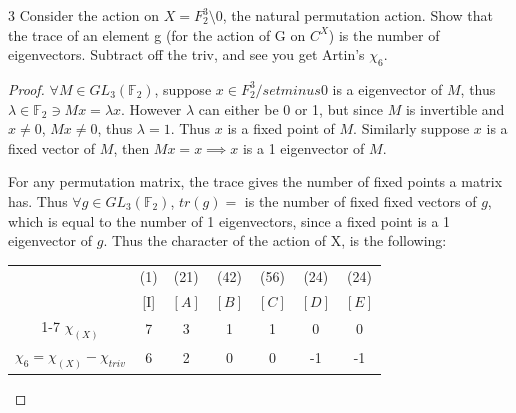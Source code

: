 \documentclass{article}
\newcommand*{\F}{\mathbb{F}}
\begin{document}
\bigskip
\begin{PROB}{3}\label{Problem 3.}
    Consider the action on $X = F_2^3 \setminus 0$, the natural permutation action. Show that the trace of an element  g (for the action of G  on $C^X$) is the number of eigenvectors. Subtract off the triv, and see you get Artin's $\chi_6$.
\end{PROB}
\begin{proof}
    $\forall M \in GL_{3}(\F_2)$, suppose $x \in F_2^3 / setminus 0$ is a eigenvector of $M$, thus $\lambda \in \F_2 \ni Mx = \lambda x$. However $\lambda$ can either be 0 or 1, but since $M$ is invertible and $x \neq 0$, $Mx \neq 0$, thus $\lambda = 1$.  Thus $x$ is a fixed point of $M$. Similarly suppose $x$ is a fixed vector of $M$, then $Mx = x \implies x$ is a 1 eigenvector of $M$. 
    
    
    For any permutation matrix, the trace gives the number of fixed points a matrix has. Thus $\forall g \in GL_{3}(\F_2)$, $tr(g) = $ is the number of fixed fixed vectors of $g$, which is equal to the number of 1 eigenvectors, since a fixed point is a 1 eigenvector of $g$. Thus the character of the action of X, is the following:
    
    
    \begin{tabular}{c | c c c c c c }
        & (1) & (21) & (42) & (56) & (24) & (24) \\
        & [I] & $[A]$ & $[B]$  & $[C]$ & $[D]$ & $[E]$   \\
        \cline{1-7}
        $\chi_{(X)}$ & 7 & 3 & 1 & 1 & 0 & 0 \\
        $\chi_6 = \chi_{(X)} - \chi_{triv}$ & 6 & 2 & 0 & 0 & -1 & -1 
    \end{tabular}
\end{proof}

\bigskip
\end{document}

